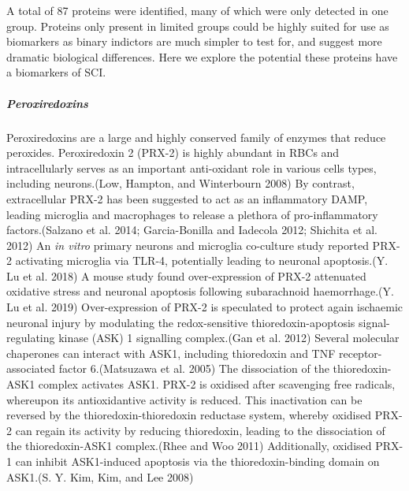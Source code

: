 \documentclass[9pt,lineno]{elife}
\begin{document}
A total of 87 proteins were identified, many of which were only detected in one group.
Proteins only present in limited groups could be highly suited for use as biomarkers as binary indictors are much simpler to test for, and suggest more dramatic biological differences.
Here we explore the potential these proteins have a biomarkers of SCI.

\hypertarget{peroxiredoxins}{%
\subparagraph{Peroxiredoxins}\label{peroxiredoxins}}

Peroxiredoxins are a large and highly conserved family of enzymes that reduce peroxides.
Peroxiredoxin 2 (PRX-2) is highly abundant in RBCs and intracellularly serves as an important anti-oxidant role in various cells types, including neurons.(Low, Hampton, and Winterbourn 2008)
By contrast, extracellular PRX-2 has been suggested to act as an inflammatory DAMP, leading microglia and macrophages to release a plethora of pro-inflammatory factors.(Salzano et al. 2014; Garcia-Bonilla and Iadecola 2012; Shichita et al. 2012)
An \emph{in vitro} primary neurons and microglia co-culture study reported PRX-2 activating microglia via TLR-4, potentially leading to neuronal apoptosis.(Y. Lu et al. 2018)
A mouse study found over-expression of PRX-2 attenuated oxidative stress and neuronal apoptosis following subarachnoid haemorrhage.(Y. Lu et al. 2019)
Over-expression of PRX-2 is speculated to protect again ischaemic neuronal injury by modulating the redox-sensitive thioredoxin-apoptosis signal-regulating kinase (ASK) 1 signalling complex.(Gan et al. 2012)
Several molecular chaperones can interact with ASK1, including thioredoxin and TNF receptor-associated factor 6.(Matsuzawa et al. 2005)
The dissociation of the thioredoxin-ASK1 complex activates ASK1.
PRX-2 is oxidised after scavenging free radicals, whereupon its antioxidantive activity is reduced.
This inactivation can be reversed by the thioredoxin-thioredoxin reductase system, whereby oxidised PRX-2 can regain its activity by reducing thioredoxin, leading to the dissociation of the thioredoxin-ASK1 complex.(Rhee and Woo 2011)
Additionally, oxidised PRX-1 can inhibit ASK1-induced apoptosis via the thioredoxin-binding domain on ASK1.(S. Y. Kim, Kim, and Lee 2008)
\end{document}
